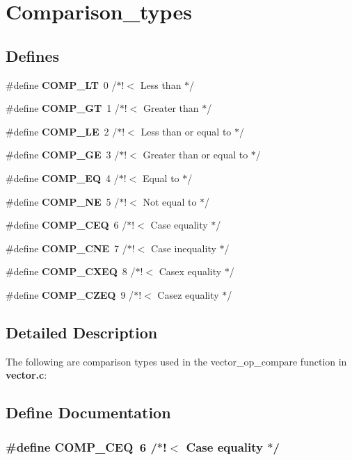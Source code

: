 \section{Comparison\_\-types}
\label{group__comparison__types}
\subsection*{Defines}
\begin{CompactItemize}
\item 
\#define {\bf COMP\_\-LT}\ 0       /$\ast$!$<$ Less than                $\ast$/
\item 
\#define {\bf COMP\_\-GT}\ 1       /$\ast$!$<$ Greater than             $\ast$/
\item 
\#define {\bf COMP\_\-LE}\ 2       /$\ast$!$<$ Less than or equal to    $\ast$/
\item 
\#define {\bf COMP\_\-GE}\ 3       /$\ast$!$<$ Greater than or equal to $\ast$/
\item 
\#define {\bf COMP\_\-EQ}\ 4       /$\ast$!$<$ Equal to                 $\ast$/
\item 
\#define {\bf COMP\_\-NE}\ 5       /$\ast$!$<$ Not equal to             $\ast$/
\item 
\#define {\bf COMP\_\-CEQ}\ 6       /$\ast$!$<$ Case equality            $\ast$/
\item 
\#define {\bf COMP\_\-CNE}\ 7       /$\ast$!$<$ Case inequality          $\ast$/
\item 
\#define {\bf COMP\_\-CXEQ}\ 8       /$\ast$!$<$ Casex equality           $\ast$/
\item 
\#define {\bf COMP\_\-CZEQ}\ 9       /$\ast$!$<$ Casez equality           $\ast$/
\end{CompactItemize}


\subsection{Detailed Description}
The following are comparison types used in the vector\_\-op\_\-compare function in {\bf vector.c}: 

\subsection{Define Documentation}
\subsubsection{\setlength{\rightskip}{0pt plus 5cm}\#define COMP\_\-CEQ\ 6       /$\ast$!$<$ Case equality            $\ast$/}\label{group__comparison__types_a6}


